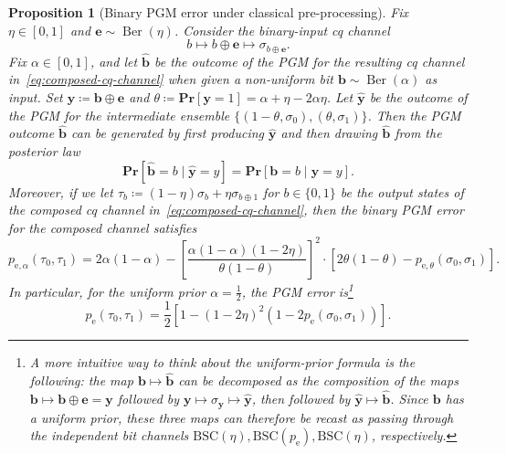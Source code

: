 \documentclass[11pt]{article}
\newtheorem{prop}[prop]{Proposition}
\theoremstyle{remark}
\newcommand{\Ber}{\operatorname{Ber}}
\newcommand{\Prb}{\mathbf{Pr}}
\newcommand{\bits}{\{0,1\}}
\newcommand{\byhat}{\widehat{\mathbf{y}}}
\newcommand{\bbhat}{\widehat{\mathbf{b}}}
\newcommand{\bb}{\mathbf{b}}
\newcommand{\be}{\mathbf{e}}
\newcommand{\by}{\mathbf{y}}
\newcommand{\BSC}{\mathrm{BSC}}
\begin{document}
\begin{prop}[Binary PGM error under classical pre-processing]
\label{prop:binary-pgm-preprocessing}
Fix $\eta \in [0,1]$ and $\be \sim \Ber(\eta)$. Consider the binary-input cq channel 
\begin{equation}
\label{eq:composed-cq-channel}
b
\longmapsto b \oplus \be
\longmapsto \sigma_{b \oplus \be}.
\end{equation}
Fix $\alpha \in [0,1]$, and let $\bbhat$ be the outcome of the PGM for the resulting cq channel in~\eqref{eq:composed-cq-channel} when given a non-uniform bit $\bb \sim \Ber(\alpha)$ as input. Set $\by \coloneqq \bb \oplus \be$ and $\theta \coloneqq \Prb[\by = 1] = \alpha + \eta - 2\alpha\eta$. Let $\byhat$ be the outcome of the PGM for the intermediate ensemble $\{(1-\theta,\sigma_0),(\theta,\sigma_1)\}$. Then the PGM outcome $\bbhat$ can be generated by first producing $\byhat$ and then drawing $\bbhat$ from the posterior law
\begin{equation*}
\Prb[\bbhat = b \mid \byhat = y] = \Prb[\bb = b \mid \by = y].
\end{equation*}
Moreover, if we let $\tau_b \coloneqq (1-\eta)\sigma_b + \eta\sigma_{b \oplus 1}$ for $b \in \bits$ be the output states of the composed cq channel in~\eqref{eq:composed-cq-channel}, then the binary PGM error for the composed channel satisfies
\begin{equation}
\label{eq:pgm-preprocessing-error}
p_{\mathrm{e},\alpha}(\tau_0,\tau_1) = 2\alpha(1-\alpha) - \left[
\frac{\alpha(1-\alpha)(1-2\eta)}
{\theta(1-\theta)}
\right]^2 \cdot \left[
2\theta(1-\theta)-p_{\mathrm{e},\theta}(\sigma_0,\sigma_1)
\right].
\end{equation}
In particular, for the uniform prior $\alpha = \frac{1}{2}$, the PGM error is\footnote{A more intuitive way to think about the uniform-prior formula is the following: the map $\bb \mapsto \bbhat$ can be decomposed as the composition of the maps $\bb \mapsto \bb \oplus \be = \by$ followed by $\by \mapsto \sigma_\by \mapsto \byhat$, then followed by $\byhat \mapsto \bbhat$. Since $\bb$ has a uniform prior, these three maps can therefore be recast as passing through the independent bit channels $\BSC(\eta), \BSC(p_{\mathrm{e}}), \BSC(\eta)$, respectively.}
\begin{equation}
\label{eq:pgm-preprocessing-error-uniform-prior}
p_{\mathrm{e}}(\tau_0,\tau_1) = \frac{1}{2}\left[1 - (1-2\eta)^2(1-2p_{\mathrm{e}}(\sigma_0,\sigma_1))\right].
\end{equation}
\end{prop}
\end{document}
